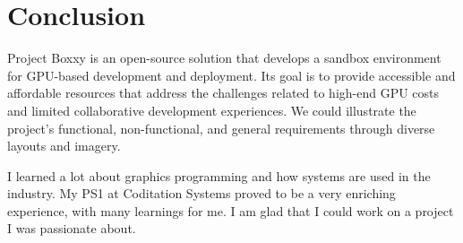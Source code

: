 
\chapter{Conclusion} %

\label{Chapter6} %




Project Boxxy is an open-source solution that develops a sandbox environment for GPU-based development and deployment. Its goal is to provide accessible and affordable resources that address the challenges related to high-end GPU costs and limited collaborative development experiences. We could illustrate the project's functional, non-functional, and general requirements through diverse layouts and imagery.

I learned a lot about graphics programming and how systems are used in the industry. My PS1 at Coditation Systems proved to be a very enriching experience, with many learnings for me.
I am glad that I could work on a project I was passionate about.